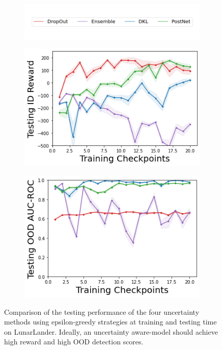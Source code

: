 \begin{figure}
    \centering
        \begin{subfigure}{.5\textwidth}
        \includegraphics[width=\textwidth]{sections/011_icml2022/resources/legend.png}
    \end{subfigure}
    \vspace{-5mm}
    
    \begin{subfigure}{.4\textwidth}
        \includegraphics[width=\textwidth]{sections/011_icml2022/resources/LunarLander-v2-mean_reward_-testing-model.png}  
    \end{subfigure}
    \begin{subfigure}{.4\textwidth}
        \includegraphics[width=\textwidth]{sections/011_icml2022/resources/LunarLanderOOD-v0-AUC-ROC-epistemic_-testing-model.png}
    \end{subfigure}
    \caption{Comparison of the testing performance of the four uncertainty methods using epsilon-greedy strategies at training and testing time on LunarLander. Ideally, an uncertainty aware-model should achieve high reward and high OOD detection scores.}
    \label{fig:model-testing-performance-lunarlander}
\end{figure}
